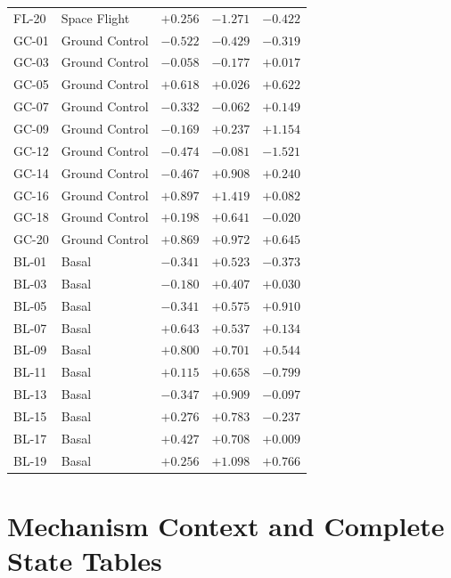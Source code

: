 \documentclass[10pt]{article}
\begin{document}
\begin{longtable}{llrrr}
FL-20 & Space Flight & $+0.256$ & $-1.271$ & $-0.422$ \\
GC-01 & Ground Control & $-0.522$ & $-0.429$ & $-0.319$ \\
GC-03 & Ground Control & $-0.058$ & $-0.177$ & $+0.017$ \\
GC-05 & Ground Control & $+0.618$ & $+0.026$ & $+0.622$ \\
GC-07 & Ground Control & $-0.332$ & $-0.062$ & $+0.149$ \\
GC-09 & Ground Control & $-0.169$ & $+0.237$ & $+1.154$ \\
GC-12 & Ground Control & $-0.474$ & $-0.081$ & $-1.521$ \\
GC-14 & Ground Control & $-0.467$ & $+0.908$ & $+0.240$ \\
GC-16 & Ground Control & $+0.897$ & $+1.419$ & $+0.082$ \\
GC-18 & Ground Control & $+0.198$ & $+0.641$ & $-0.020$ \\
GC-20 & Ground Control & $+0.869$ & $+0.972$ & $+0.645$ \\
BL-01 & Basal & $-0.341$ & $+0.523$ & $-0.373$ \\
BL-03 & Basal & $-0.180$ & $+0.407$ & $+0.030$ \\
BL-05 & Basal & $-0.341$ & $+0.575$ & $+0.910$ \\
BL-07 & Basal & $+0.643$ & $+0.537$ & $+0.134$ \\
BL-09 & Basal & $+0.800$ & $+0.701$ & $+0.544$ \\
BL-11 & Basal & $+0.115$ & $+0.658$ & $-0.799$ \\
BL-13 & Basal & $-0.347$ & $+0.909$ & $-0.097$ \\
BL-15 & Basal & $+0.276$ & $+0.783$ & $-0.237$ \\
BL-17 & Basal & $+0.427$ & $+0.708$ & $+0.009$ \\
BL-19 & Basal & $+0.256$ & $+1.098$ & $+0.766$ \\
\end{longtable}

\section{Mechanism Context and Complete State Tables}

\begin{table}[H]
\centering\scriptsize
\caption{\textbf{Mechanism convergence summary.} Mechanisms are classified as outcome anchors, candidate upstream axes, or candidate context signatures. Association q-values are from score-versus-remodeling tests; gene-priority q-values summarize whether network-ranked genes enrich for the mechanism set.}
\label{tab:mechconv}
\end{table}
\end{document}
